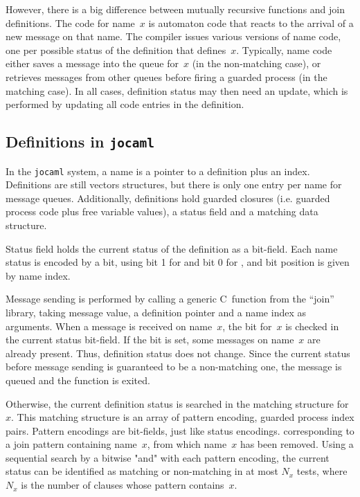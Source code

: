 However, there is a big difference between mutually recursive
functions and join definitions.  The code for name~$x$ is automaton
code that reacts to the arrival of a new message on that name.  The
compiler issues various versions of name code, one per possible status
of the definition that defines~$x$.  Typically, name code either saves
a message into the queue for~$x$ (in the non-matching case), or
retrieves messages from other queues before firing a guarded process
(in the matching case). In all cases, definition status may then
need an update, which is performed by updating all code entries in
the definition.


\subsection{Definitions in {\tt jocaml}}

In the {\tt jocaml} system, a name is a pointer to a definition plus
an index.  Definitions are still vectors structures, but there is only
one entry per name for message queues. Additionally, definitions hold
guarded closures (i.e. guarded process code plus free variable
values), a status field and a matching data structure.

Status field holds the current status of the definition as a
bit-field.  Each name status is encoded by a bit, using bit 1 for
 and bit 0 for , and bit position is given by name
index.

Message sending is performed by calling a generic C~function from the
``join'' library, taking message value, a definition pointer and a
name index as arguments.  When a message is received on name~$x$, the
bit for~$x$ is checked in the current status bit-field. If the bit is
set, some messages on name~$x$ are already present. Thus, definition
status does not change. Since the current status before message
sending is guaranteed to be a non-matching one, the message is queued
and the function is exited.

Otherwise, the current definition status is searched in the matching
structure for~$x$. This matching structure is an array of pattern
encoding, guarded process index pairs. Pattern encodings are
bit-fields, just like status encodings.
 corresponding to a join pattern containing name~$x$, from which name~$x$ has been removed. Using a sequential
search by a bitwise "and" with each pattern encoding, the current
status can be identified as matching or non-matching in at most $N_x$
tests, where $N_x$ is the number of clauses whose pattern contains~$x$.

